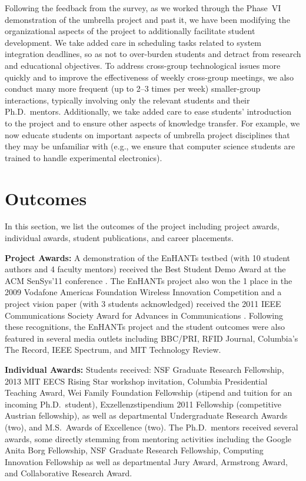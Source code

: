 \documentclass[journal,twopages]{IEEEtran}
\newcommand{\makered}[1]{\color{black}#1\color{black}}
\begin{document}
\makered{Following the feedback from the survey, as we worked through the Phase~VI demonstration of the umbrella project and past it, we have been modifying the organizational aspects of the project to additionally facilitate student development. We take added care in scheduling tasks related to system integration deadlines, so as not to over-burden students and detract from research and educational objectives.
To address cross-group technological issues more quickly and to improve the effectiveness of weekly cross-group meetings, we also conduct many more frequent (up to 2--3 times per week) smaller-group interactions, typically involving only the relevant students and their Ph.D.\ mentors. Additionally, we take added care to ease students' introduction to the project and to ensure other aspects of knowledge transfer. For example, we now educate students on important aspects of umbrella project disciplines that they may be unfamiliar with (e.g., we ensure that computer science students are trained to handle experimental electronics).}



\section{Outcomes}\label{sect:outcomes}
In this section, we list the outcomes of the project including project awards, individual awards, student publications, and career placements.

\noindent\textbf{Project Awards:} A demonstration of the
EnHANTs testbed (with 10 student authors and 4 faculty mentors) received
the Best Student Demo Award at the ACM SenSys'11 conference
\cite{SenSys2011Demo}. The EnHANTs project also won the 1
place in the 2009 Vodafone Americas Foundation Wireless Innovation
Competition and a project vision paper (with 3 students acknowledged)
received the 2011 IEEE Communications Society Award for Advances in
Communications \cite{Gorlatova_Enhants_wircom}. Following these
recognitions, the EnHANTs project and the student outcomes were also
featured in several media outlets including BBC/PRI, RFID Journal,
Columbia's The Record, IEEE Spectrum, and MIT Technology Review.

\noindent\textbf{Individual Awards:} Students received: 
NSF Graduate Research Fellowship, 2013 MIT EECS Rising Star workshop
invitation, Columbia Presidential Teaching Award, Wei Family Foundation
Fellowship (stipend and tuition for an incoming Ph.D.\ student),
Exzellenzstipendium 2011 Fellowship (competitive Austrian fellowship),
as well as departmental Undergraduate Research Awards (two), and M.S.\ Awards of
Excellence (two). The Ph.D.\ mentors received several awards, some 
directly stemming from mentoring activities including the Google
Anita Borg Fellowship, NSF Graduate Research Fellowship, Computing
Innovation Fellowship as well as departmental Jury Award, Armstrong
Award, and Collaborative Research Award. 
\end{document}
